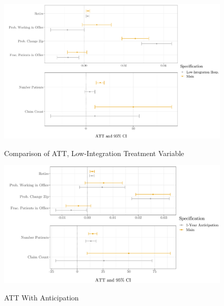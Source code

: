 \documentclass[11pt]{article}
\begin{document}
\begin{figure}[ht]
    \centering
    \caption{Comparison of ATT, Low-Integration Treatment Variable}
    \includegraphics[scale=.5]{Objects/LI_results.pdf}
    \label{fig:LI}
\end{figure}

\begin{figure}[ht]
    \centering
    \caption{ATT With Anticipation}
    \includegraphics[scale=.57]{Objects/anticipation_graph.pdf}
    \label{fig:anticipation}
\end{figure}
\end{document}
